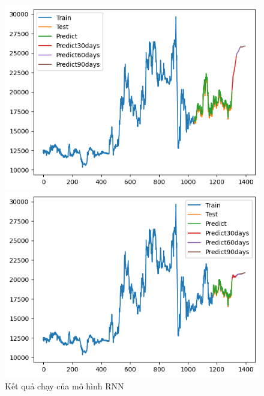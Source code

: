 \begin{figure}[H]
\begin{minipage}{0.15\textwidth}
    \end{minipage}
    \hfill
    \begin{minipage}{0.15\textwidth}
    \centering
    \includegraphics[width=1\textwidth]{resources/chapter-5/newdata1/result/EIB_ RNN_8-2.png}
    \end{minipage}
    \hfill
        \begin{minipage}{0.15\textwidth}
    \centering
    \includegraphics[width=1\textwidth]{resources/chapter-5/newdata1/result/EIB_ RNN_9-1.png}
    \end{minipage}
    \hfill
    
    \caption{Kết quả chạy của mô hình RNN}
    \label{fig:RNN}
\end{figure}


